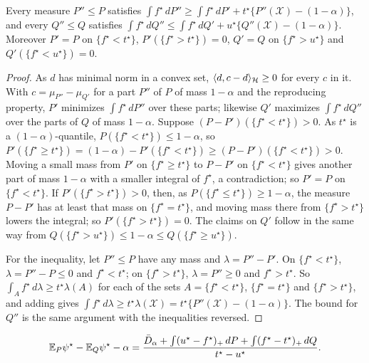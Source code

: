 \begin{lemma}
\label{lem:excessbathtub}
Every measure $P''\le P$ satisfies $\int f^\star\,dP''\ge\int f^\star\,dP'+t^\star\{P''(\mathcal X)-(1-\alpha)\}$, and
every $Q''\le Q$ satisfies $\int f^\star\,dQ''\le\int f^\star\,dQ'+u^\star\{Q''(\mathcal X)-(1-\alpha)\}$. Moreover
$P'=P$ on $\{f^\star<t^\star\}$, $P'(\{f^\star>t^\star\})=0$, $Q'=Q$ on $\{f^\star>u^\star\}$ and
$Q'(\{f^\star<u^\star\})=0$.
\end{lemma}

\begin{proof}
As $d$ has minimal norm in a convex set, $\langle d,c-d\rangle_{\mathcal{H}}\ge0$ for every $c$ in it. With
$c=\mu_{P''}-\mu_{Q'}$ for a part $P''$ of $P$ of mass $1-\alpha$ and the reproducing property, $P'$ minimizes
$\int f^\star\,dP''$ over these parts; likewise $Q'$ maximizes $\int f^\star\,dQ''$ over the parts of $Q$ of mass
$1-\alpha$. Suppose $(P-P')(\{f^\star<t^\star\})>0$. As $t^\star$ is a $(1-\alpha)$-quantile,
$P(\{f^\star<t^\star\})\le1-\alpha$, so $P'(\{f^\star\ge t^\star\})=(1-\alpha)-P'(\{f^\star<t^\star\})\ge
(P-P')(\{f^\star<t^\star\})>0$. Moving a small mass from $P'$ on $\{f^\star\ge t^\star\}$ to $P-P'$ on
$\{f^\star<t^\star\}$ gives another part of mass $1-\alpha$ with a smaller integral of $f^\star$, a contradiction; so
$P'=P$ on $\{f^\star<t^\star\}$. If $P'(\{f^\star>t^\star\})>0$, then, as $P(\{f^\star\le t^\star\})\ge1-\alpha$, the
measure $P-P'$ has at least that mass on $\{f^\star=t^\star\}$, and moving mass there from $\{f^\star>t^\star\}$ lowers
the integral; so $P'(\{f^\star>t^\star\})=0$. The claims on $Q'$ follow in the same way from
$Q(\{f^\star>u^\star\})\le1-\alpha\le Q(\{f^\star\ge u^\star\})$.

For the inequality, let $P''\le P$ have any mass and $\lambda=P''-P'$. On $\{f^\star<t^\star\}$, $\lambda=P''-P\le0$
and $f^\star<t^\star$; on $\{f^\star>t^\star\}$, $\lambda=P''\ge0$ and $f^\star>t^\star$. So
$\int_Af^\star\,d\lambda\ge t^\star\lambda(A)$ for each of the sets $A=\{f^\star<t^\star\}$,
$\{f^\star=t^\star\}$ and $\{f^\star>t^\star\}$, and adding gives
$\int f^\star\,d\lambda\ge t^\star\lambda(\mathcal X)=t^\star\{P''(\mathcal X)-(1-\alpha)\}$. The bound for
$Q''$ is the same argument with the inequalities reversed.
\end{proof}

\begin{lemma}
\label{lem:excessid}
\[
\mathbb{E}_P\psi^\star-\mathbb{E}_Q\psi^\star-\alpha
=\frac{\bar D_\alpha+\int(u^\star-f^\star)_+\,dP+\int(f^\star-t^\star)_+\,dQ}{t^\star-u^\star} .
\]
\end{lemma}

